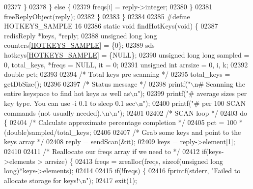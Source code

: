 \begin{DoxyCode}
{{{{{{{{{{{{{{{{{{{{{{{{{{{{{{{{{{{{{{{{{{{{{{{{{{{{{{{{{{{{{{{{{{{{{{{{{{{{{{{02377             \}
02378         \} \textcolor{keywordflow}{else} \{
02379             freqs[i] = reply->integer;
02380         \}
02381         freeReplyObject(reply);
02382     \}
02383 \}
02384 
02385 \textcolor{preprocessor}{#}\textcolor{preprocessor}{define} \textcolor{preprocessor}{HOTKEYS\_SAMPLE} 16
02386 \textcolor{keyword}{static} \textcolor{keywordtype}{void} findHotKeys(\textcolor{keywordtype}{void}) \{
02387     redisReply *keys, *reply;
02388     \textcolor{keywordtype}{unsigned} \textcolor{keywordtype}{long} \textcolor{keywordtype}{long} counters[\hyperlink{redis-cli_8c_a0f10197c353b6fcaf73df928885167ca}{HOTKEYS\_SAMPLE}] = \{0\};
02389     sds hotkeys[\hyperlink{redis-cli_8c_a0f10197c353b6fcaf73df928885167ca}{HOTKEYS\_SAMPLE}] = \{NULL\};
02390     \textcolor{keywordtype}{unsigned} \textcolor{keywordtype}{long} \textcolor{keywordtype}{long} sampled = 0, total\_keys, *freqs = NULL, it = 0;
02391     \textcolor{keywordtype}{unsigned} \textcolor{keywordtype}{int} arrsize = 0, i, k;
02392     \textcolor{keywordtype}{double} pct;
02393 
02394     \textcolor{comment}{/* Total keys pre scanning */}
02395     total\_keys = getDbSize();
02396 
02397     \textcolor{comment}{/* Status message */}
02398     printf(\textcolor{stringliteral}{"\(\backslash\)n# Scanning the entire keyspace to find hot keys as well as\(\backslash\)n"});
02399     printf(\textcolor{stringliteral}{"# average sizes per key type.  You can use -i 0.1 to sleep 0.1 sec\(\backslash\)n"});
02400     printf(\textcolor{stringliteral}{"# per 100 SCAN commands (not usually needed).\(\backslash\)n\(\backslash\)n"});
02401 
02402     \textcolor{comment}{/* SCAN loop */}
02403     \textcolor{keywordflow}{do} \{
02404         \textcolor{comment}{/* Calculate approximate percentage completion */}
02405         pct = 100 * (\textcolor{keywordtype}{double})sampled/total\_keys;
02406 
02407         \textcolor{comment}{/* Grab some keys and point to the keys array */}
02408         reply = sendScan(&it);
02409         keys  = reply->element[1];
02410 
02411         \textcolor{comment}{/* Reallocate our freqs array if we need to */}
02412         \textcolor{keywordflow}{if}(keys->elements > arrsize) \{
02413             freqs = zrealloc(freqs, \textcolor{keyword}{sizeof}(\textcolor{keywordtype}{unsigned} \textcolor{keywordtype}{long} \textcolor{keywordtype}{long})*keys->elements);
02414 
02415             \textcolor{keywordflow}{if}(!freqs) \{
02416                 fprintf(stderr, \textcolor{stringliteral}{"Failed to allocate storage for keys!\(\backslash\)n"});
02417                 exit(1);
}}}}}}}}}}}}}}}}}}}}}}}}}}}}}}}}}}}}}}}}}}}}}}}}}}}}}}}}}}}}}}}}}}}}}}}}}}}}}}}
\end{DoxyCode}
